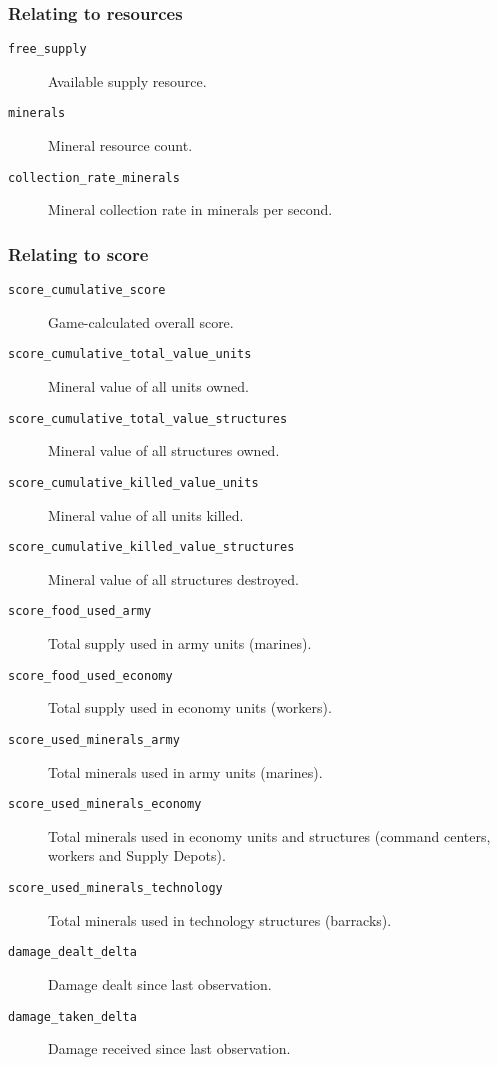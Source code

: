\subsubsection*{Relating to resources}
\begin{description}
    \item[\texttt{free\_supply}] Available supply resource.
    \item[\texttt{minerals}] Mineral resource count.
    \item[\texttt{collection\_rate\_minerals}] Mineral collection rate in minerals per second.
\end{description}

\subsubsection*{Relating to score}
\begin{description}
    \item[\texttt{score\_cumulative\_score}] Game-calculated overall score.
    \item[\texttt{score\_cumulative\_total\_value\_units}] Mineral value of all units owned.
    \item[\texttt{score\_cumulative\_total\_value\_structures}] Mineral value of all structures owned.
    \item[\texttt{score\_cumulative\_killed\_value\_units}] Mineral value of all units killed.
    \item[\texttt{score\_cumulative\_killed\_value\_structures}] Mineral value of all structures destroyed.
    \item[\texttt{score\_food\_used\_army}] Total supply used in army units (marines).
    \item[\texttt{score\_food\_used\_economy}] Total supply used in economy units (workers).
    \item[\texttt{score\_used\_minerals\_army}] Total minerals used in army units (marines).
    \item[\texttt{score\_used\_minerals\_economy}] Total minerals used in economy units and structures (command centers, workers and Supply Depots).
    \item[\texttt{score\_used\_minerals\_technology}] Total minerals used in technology structures (barracks).
    \item[\texttt{damage\_dealt\_delta}] Damage dealt since last observation.
    \item[\texttt{damage\_taken\_delta}] Damage received since last observation.
\end{description}

